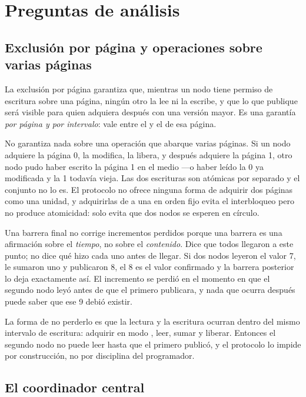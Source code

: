 \section{Preguntas de análisis}

\subsection{Exclusión por página y operaciones sobre varias páginas}

La exclusión por página garantiza que, mientras un nodo tiene permiso de
escritura sobre una página, ningún otro la lee ni la escribe, y que lo que
publique será visible para quien adquiera después con una versión mayor. Es
una garantía \emph{por página y por intervalo}: vale entre el
 y el  de esa página.

No garantiza nada sobre una operación que abarque varias páginas. Si un nodo
adquiere la página 0, la modifica, la libera, y después adquiere la página 1,
otro nodo pudo haber escrito la página 1 en el medio —o haber leído la 0 ya
modificada y la 1 todavía vieja. Las dos escrituras son atómicas por separado
y el conjunto no lo es. El protocolo no ofrece ninguna forma de adquirir dos
páginas como una unidad, y adquirirlas de a una en orden fijo evita el
interbloqueo pero no produce atomicidad: solo evita que dos nodos se esperen
en círculo.

Una barrera final no corrige incrementos perdidos porque una barrera es una
afirmación sobre el \emph{tiempo}, no sobre el \emph{contenido}. Dice que
todos llegaron a este punto; no dice qué hizo cada uno antes de llegar. Si dos
nodos leyeron el valor 7, le sumaron uno y publicaron 8, el 8 es el valor
confirmado y la barrera posterior lo deja exactamente así. El incremento se
perdió en el momento en que el segundo nodo leyó antes de que el primero
publicara, y nada que ocurra después puede saber que ese 9 debió existir.

La forma de no perderlo es que la lectura y la escritura ocurran dentro del
mismo intervalo de escritura: adquirir en modo , leer, sumar y
liberar. Entonces el segundo nodo no puede leer hasta que el primero publicó,
y el protocolo lo impide por construcción, no por disciplina del programador.

\subsection{El coordinador central}

